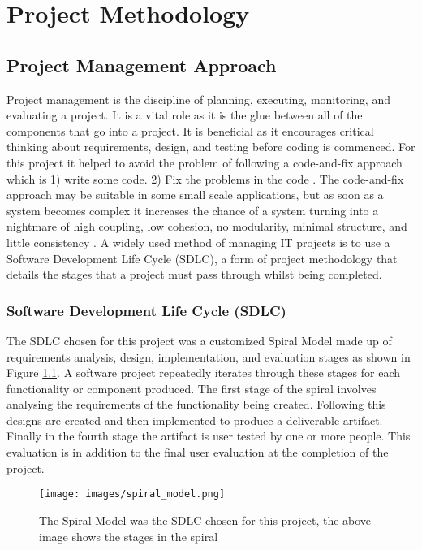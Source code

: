 
\chapter{Project Methodology}\label{C:m}

\section{Project Management Approach}
Project management is the discipline of planning, executing, monitoring, and
evaluating a project. It is a vital role as it is the glue between all of the
 components that go into a project. It is beneficial as it
encourages critical thinking about requirements, design, and testing before coding is
commenced. For this project it helped to avoid the problem of following a
code-and-fix approach which is 1) write some code. 2) Fix the problems in
the code \cite{boehm1988spiral}. The code-and-fix approach may be suitable in some 
small scale applications, but as soon as a system becomes complex it increases
the chance of a system turning into a nightmare of high coupling, low cohesion,
no modularity, minimal structure, and little consistency \cite{foote1997big}.
A widely used method of managing IT projects is to use a Software Development
Life Cycle (SDLC), a form of project methodology that details the stages that a project must pass through whilst being completed.

\subsection{Software Development Life Cycle (SDLC)}
The SDLC chosen for
this project was a customized Spiral Model \cite{boehm1988spiral} made up of
requirements analysis, design, implementation, and evaluation stages as shown in
Figure \ref{fig:spiralModel}. A software project repeatedly iterates through these stages for each functionality or component produced. The first stage of the spiral involves analysing the
requirements of the functionality being created. Following this designs are created and then implemented to produce a deliverable artifact. Finally in the fourth stage the artifact is user tested by one
or more people. This evaluation is in addition to the final user evaluation at the completion of the project. 

\begin{figure}[H]
  \centering
      \texttt{[image: images/spiral\_model.png]}
  \caption[Spiral Model]{The Spiral Model was the SDLC chosen for this project, the above image shows the stages in the spiral}
  \label{fig:spiralModel}
\end{figure}

